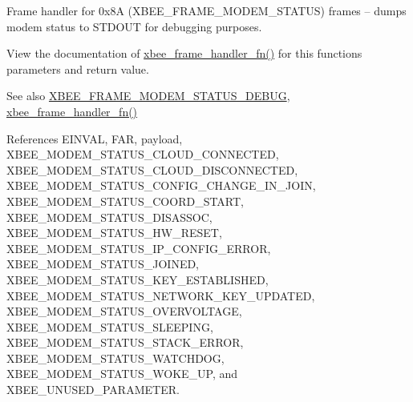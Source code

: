 Frame handler for 0x8A (X\+B\+E\+E\+\_\+\+F\+R\+A\+M\+E\+\_\+\+M\+O\+D\+E\+M\+\_\+\+S\+T\+A\+T\+US) frames -- dumps modem status to S\+T\+D\+O\+UT for debugging purposes. 

View the documentation of \hyperlink{group__xbee__device_ga3e6f2b540e8cec7a69ef0b0166da14ff}{xbee\+\_\+frame\+\_\+handler\+\_\+fn()} for this function\textquotesingle{}s parameters and return value.

\begin{DoxySeeAlso}{See also}
\hyperlink{group__xbee__device_gabeb9dfc3097d684df3fd9284021085f6}{X\+B\+E\+E\+\_\+\+F\+R\+A\+M\+E\+\_\+\+M\+O\+D\+E\+M\+\_\+\+S\+T\+A\+T\+U\+S\+\_\+\+D\+E\+B\+UG}, \hyperlink{group__xbee__device_ga3e6f2b540e8cec7a69ef0b0166da14ff}{xbee\+\_\+frame\+\_\+handler\+\_\+fn()} 
\end{DoxySeeAlso}


References E\+I\+N\+V\+AL, F\+AR, payload, X\+B\+E\+E\+\_\+\+M\+O\+D\+E\+M\+\_\+\+S\+T\+A\+T\+U\+S\+\_\+\+C\+L\+O\+U\+D\+\_\+\+C\+O\+N\+N\+E\+C\+T\+ED, X\+B\+E\+E\+\_\+\+M\+O\+D\+E\+M\+\_\+\+S\+T\+A\+T\+U\+S\+\_\+\+C\+L\+O\+U\+D\+\_\+\+D\+I\+S\+C\+O\+N\+N\+E\+C\+T\+ED, X\+B\+E\+E\+\_\+\+M\+O\+D\+E\+M\+\_\+\+S\+T\+A\+T\+U\+S\+\_\+\+C\+O\+N\+F\+I\+G\+\_\+\+C\+H\+A\+N\+G\+E\+\_\+\+I\+N\+\_\+\+J\+O\+IN, X\+B\+E\+E\+\_\+\+M\+O\+D\+E\+M\+\_\+\+S\+T\+A\+T\+U\+S\+\_\+\+C\+O\+O\+R\+D\+\_\+\+S\+T\+A\+RT, X\+B\+E\+E\+\_\+\+M\+O\+D\+E\+M\+\_\+\+S\+T\+A\+T\+U\+S\+\_\+\+D\+I\+S\+A\+S\+S\+OC, X\+B\+E\+E\+\_\+\+M\+O\+D\+E\+M\+\_\+\+S\+T\+A\+T\+U\+S\+\_\+\+H\+W\+\_\+\+R\+E\+S\+ET, X\+B\+E\+E\+\_\+\+M\+O\+D\+E\+M\+\_\+\+S\+T\+A\+T\+U\+S\+\_\+\+I\+P\+\_\+\+C\+O\+N\+F\+I\+G\+\_\+\+E\+R\+R\+OR, X\+B\+E\+E\+\_\+\+M\+O\+D\+E\+M\+\_\+\+S\+T\+A\+T\+U\+S\+\_\+\+J\+O\+I\+N\+ED, X\+B\+E\+E\+\_\+\+M\+O\+D\+E\+M\+\_\+\+S\+T\+A\+T\+U\+S\+\_\+\+K\+E\+Y\+\_\+\+E\+S\+T\+A\+B\+L\+I\+S\+H\+ED, X\+B\+E\+E\+\_\+\+M\+O\+D\+E\+M\+\_\+\+S\+T\+A\+T\+U\+S\+\_\+\+N\+E\+T\+W\+O\+R\+K\+\_\+\+K\+E\+Y\+\_\+\+U\+P\+D\+A\+T\+ED, X\+B\+E\+E\+\_\+\+M\+O\+D\+E\+M\+\_\+\+S\+T\+A\+T\+U\+S\+\_\+\+O\+V\+E\+R\+V\+O\+L\+T\+A\+GE, X\+B\+E\+E\+\_\+\+M\+O\+D\+E\+M\+\_\+\+S\+T\+A\+T\+U\+S\+\_\+\+S\+L\+E\+E\+P\+I\+NG, X\+B\+E\+E\+\_\+\+M\+O\+D\+E\+M\+\_\+\+S\+T\+A\+T\+U\+S\+\_\+\+S\+T\+A\+C\+K\+\_\+\+E\+R\+R\+OR, X\+B\+E\+E\+\_\+\+M\+O\+D\+E\+M\+\_\+\+S\+T\+A\+T\+U\+S\+\_\+\+W\+A\+T\+C\+H\+D\+OG, X\+B\+E\+E\+\_\+\+M\+O\+D\+E\+M\+\_\+\+S\+T\+A\+T\+U\+S\+\_\+\+W\+O\+K\+E\+\_\+\+UP, and X\+B\+E\+E\+\_\+\+U\+N\+U\+S\+E\+D\+\_\+\+P\+A\+R\+A\+M\+E\+T\+ER.

\mbox{\label{group__xbee__device_ga51f281b72bffcc99eec0e8c7f65a5f3f}} 

